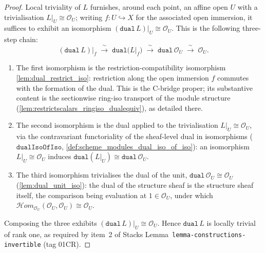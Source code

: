 \begin{proof}
  \leanok
  Local triviality of \(L\) furnishes, around each point, an affine open \(U\) with a
  trivialisation \(L|_U \cong \mathcal{O}_U\); writing \(f : U \hookrightarrow X\) for the
  associated open immersion, it suffices to exhibit an isomorphism
  \((\mathtt{dual}\,L)|_U \cong \mathcal{O}_U\). This is the following three-step chain:
  \[
    (\mathtt{dual}\,L)\big|_f
      \;\xrightarrow{\ \sim\ }\; \mathtt{dual}\bigl(L|_f\bigr)
      \;\xrightarrow{\ \sim\ }\; \mathtt{dual}\,\mathcal{O}_U
      \;\xrightarrow{\ \sim\ }\; \mathcal{O}_U.
  \]
  \begin{enumerate}
    \item The first isomorphism is the restriction-compatibility isomorphism
      \cref{lem:dual_restrict_iso}: restriction along the open immersion \(f\) commutes
      with the formation of the dual. This is the C-bridge proper; its substantive content
      is the sectionwise ring-iso transport of the module structure
      (\cref{lem:restrictscalars_ringiso_dualequiv}), as detailed there.
    \item The second isomorphism is the dual applied to the trivialisation
      \(L|_U \cong \mathcal{O}_U\), via the contravariant functoriality of the sheaf-level
      dual in isomorphisms (\(\mathtt{dualIsoOfIso}\),
      \cref{def:scheme_modules_dual_iso_of_iso}): an isomorphism \(L|_U \cong \mathcal{O}_U\)
      induces \(\mathtt{dual}(L|_U) \cong \mathtt{dual}\,\mathcal{O}_U\).
    \item The third isomorphism trivialises the dual of the unit,
      \(\mathtt{dual}\,\mathcal{O}_U \cong \mathcal{O}_U\) (\cref{lem:dual_unit_iso}):
      the dual of the structure sheaf is the structure sheaf itself, the comparison being
      evaluation at \(1 \in \mathcal{O}_U\), under which
      \(\mathcal{H}om_{\mathcal{O}_U}(\mathcal{O}_U, \mathcal{O}_U) \cong \mathcal{O}_U\).
  \end{enumerate}
  Composing the three exhibits \((\mathtt{dual}\,L)|_U \cong \mathcal{O}_U\). Hence
  \(\mathtt{dual}\,L\) is locally trivial of rank one, as required by item~2 of Stacks
  Lemma~\texttt{lemma-constructions-invertible} (tag 01CR).
\end{proof}

